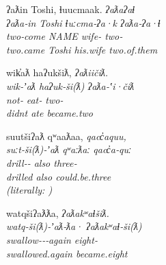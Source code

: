 \begin{exe}
  \ex\label{ex:4.2}
  \begin{xlist}

    \ex\label{ex:4.2a}
    \gllll ʔaƛin    Toshi, ɬuucmaak.     \em{ʔaƛaʔaɬ}\\
           ʔaƛa‑in  Toshi  ɬuːcma‑ʔa·k    \em{ʔaƛa‑ʔa·ɬ}\\
           two‑come NAME   wife‑ \em{two‑}\\
           two.came Toshi  his.wife      \em{two.of.them}\\

    \ex\label{ex:4.2b}
    \gllll wik̓aƛ        haʔukšiƛ,    \em{ʔaƛiičiƛ}.\\
           wik‑ʼaƛ      haʔuk‑ši(ƛ)  \em{ʔaƛa‑ʽi·čiƛ}\\
           not‑ eat‑ \em{two‑}\\
           didnt        ate          \em{became.two}\\

    \ex\label{ex:4.2c}
    \gllll suutšiʔaƛ               qʷaaƛaa, \em{qacc̓aquu},\\
           suːt‑ši(ƛ)‑ʼaƛ          qʷaːƛaː  \em{qacc̓a‑quː}\\
           drill‑‑ also     \em{three‑}\\
           drilled                 also     \em{could.be.three}\\
            (literally: )

    \ex\label{ex:4.2d}
    \gllll watqšiʔaƛƛa,                   \em{ʔaƛakʷaɬšiƛ}.\\
           watq‑ši(ƛ)‑ʼaƛ‑ƛa·              \em{ʔaƛakʷaɬ‑ši(ƛ)}\\
           swallow‑‑‑again \em{eight‑}\\
           swallowed.again                \em{became.eight}\\

  \end{xlist}
\end{exe}

